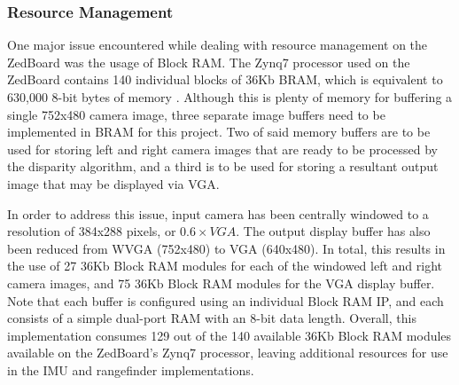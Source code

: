 \subsubsection{Resource Management} \label{dataman}
One major issue encountered while dealing with resource management on the ZedBoard was the usage of Block RAM. The Zynq7 processor used on the ZedBoard contains 140 individual blocks of 36Kb BRAM, which is equivalent to 630,000 8-bit bytes of memory \cite{zynq7bram}. Although this is plenty of memory for buffering a single 752x480 camera image, three separate image buffers need to be implemented in BRAM for this project. Two of said memory buffers are to be used for storing left and right camera images that are ready to be processed by the disparity algorithm, and a third is to be used for storing a resultant output image that may be displayed via VGA.
\par
In order to address this issue, input camera has been centrally windowed to a resolution of 384x288 pixels, or $0.6\times{}VGA$. The output display buffer has also been reduced from WVGA (752x480) to VGA (640x480). In total, this results in the use of 27 36Kb Block RAM modules for each of the windowed left and right camera images, and 75 36Kb Block RAM modules for the VGA display buffer. Note that each buffer is configured using an individual Block RAM IP, and each consists of a simple dual-port RAM with an 8-bit data length. Overall, this implementation consumes 129 out of the 140 available 36Kb Block RAM modules available on the ZedBoard's Zynq7 processor, leaving additional resources for use in the IMU and rangefinder implementations. 